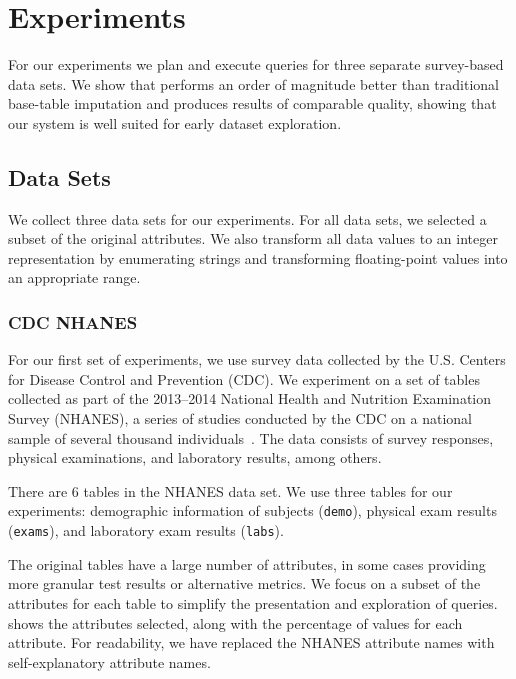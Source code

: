 \section{Experiments}\label{sec:experiments}
For our experiments we plan and execute queries for three separate survey-based data sets.
We show that \ProjectName{} performs an order of magnitude better than traditional
base-table imputation and produces results of comparable quality, showing that our system is well suited for early dataset exploration.

\subsection{Data Sets}\label{subsec:datasets}
We collect three data sets for our experiments.
For all data sets, we selected a subset of the original attributes.
We also transform all data values to an integer representation by enumerating strings and transforming floating-point values into an appropriate range.

\subsubsection{CDC NHANES}
For our first set of experiments, we use survey data collected by the 
U.S. Centers for Disease Control and Prevention (CDC). We
experiment on a set of tables collected as part of the 2013--2014 National
Health and Nutrition Examination Survey (NHANES), a series of studies
conducted by the CDC on a national sample of several thousand individuals~\cite{cdc-data}.
The data consists of survey responses, physical examinations, and laboratory
results, among others.

There are 6 tables in the NHANES data set. We use three tables for our experiments: demographic information of subjects (\texttt{demo}), physical exam results (\texttt{exams}), and laboratory exam results (\texttt{labs}).

The original tables have a large number of attributes, in some cases providing more granular test results or alternative metrics.
We focus on a subset of the attributes for each table to simplify the presentation and exploration of queries.
 shows the attributes selected, along with the percentage of \nullv{} values for each attribute.
For readability, we have replaced the NHANES attribute names with self-explanatory attribute names.

